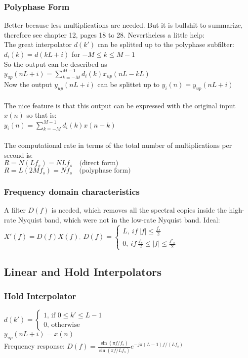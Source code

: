 \subsubsection{Polyphase Form}
Better because less multiplications are needed. But it is bullshit to summarize, therefore see chapter 12, pages 18 to 28.
Nevertheless a little help:\\
The great interpolator $d(k')$ can be splitted up to the polyphase subfilter: $d_i(k) = d(kL+i)$ for $-M\leq k \leq M-1$\\
So the output can be described as $y_{up}(nL+i)=\sum\limits_{k=-M}^{M-1} d_i(k) x_{up}(nL-kL)$\\
Now the output $y_{up}(nL+i)$ can be splittet up to $y_i(n)=y_{up}(nL+i)$\\\\
The nice feature is that this output can be expressed with the original input $x(n)$ so that is:\\ $y_i(n)=\sum\limits_{k=-M}^{M-1} d_i(k) x(n-k)$\\\\
The computational rate in terms of the total number of multiplications per second is:\\
 $R=N (L f_s)=N L f_s \quad \text{(direct form)}$\\
 $R=L (2M f_s)=N f_s \quad \text{(polyphase form)}$\\
\subsubsection{Frequency domain characteristics}
A filter $D(f)$ is needed, which removes all the spectral copies inside the high-rate Nyquist band, which were not in the low-rate Nyquist band. Ideal: $X'(f) = D(f)X(f)$.
$D(f)=\begin{cases} L,\ if\ |f|\leq\frac{f_s}{2}\\
0,\ if\ \frac{f_s}{2}\leq |f|\leq\frac{f'_s}{2}
\end{cases}$

\subsection{Linear and Hold Interpolators}
\subsubsection{Hold Interpolator}
$d(k')=\begin{cases}
1\text{, if }0\leq k' \leq L -1\\
0\text{, otherwise}\end{cases}$\\
$y_{up}(nL+i)=x(n)$\\
Frequency response: $D(f)=\frac{\sin(\pi f/f_s)}{\sin(\pi f/Lf_s)}e^{-j\pi(L-1)f/(Lf_s)}$
